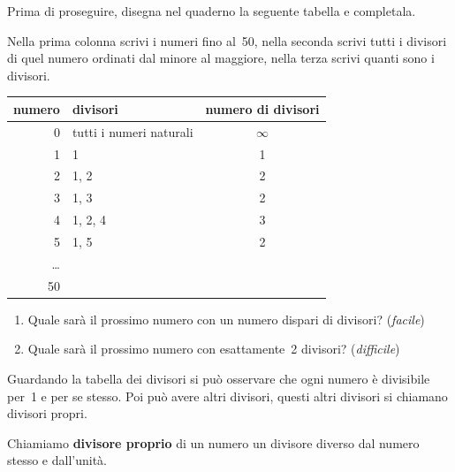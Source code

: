 Prima di proseguire, disegna nel quaderno la seguente tabella e completala. 

Nella prima colonna scrivi i numeri fino al~50, nella seconda scrivi tutti 
i divisori di quel numero ordinati dal minore al maggiore, nella terza 
scrivi quanti sono i divisori.

{\centering
\begin{tabular}{|r|p{6cm}|c|}
\hline
\textsf{\relax 
numero
} & \textsf{\relax 
          divisori 
} & \textsf{\relax 
numero di divisori
}\\
\hline
0 & tutti i numeri naturali & \(\infty\)\\
\hline
1 & 1 & 1\\
\hline
2 & 1, 2 & 2\\
\hline
3 & 1, 3 & 2\\
\hline
4 & 1, 2, 4 & 3\\
\hline
5 & 1, 5 & 2\\
\hline
\dots &  & \\
\hline
50 &  & \\
\hline
\end{tabular}}

\begin{enumerate}[noitemsep, label=(\alph*)]
\item Quale sarà il prossimo numero con un numero dispari 
di divisori? (\emph{facile})
\item Quale sarà il prossimo numero con esattamente~2
divisori? (\emph{difficile})
\end{enumerate}

Guardando la tabella dei divisori si può osservare che ogni numero è 
divisibile per~1 e per se stesso. Poi può avere altri divisori, questi
altri divisori si chiamano divisori propri.

\begin{definizione}{}{}
Chiamiamo \textbf{divisore proprio} di un numero un divisore diverso dal 
numero stesso e dall'unità.
\end{definizione}

